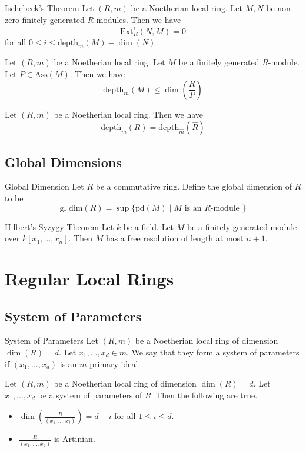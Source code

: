 \documentclass[a4paper]{article}
\begin{document}
\begin{thm}{Ischebeck's Theorem}{} Let $(R,m)$ be a Noetherian local ring. Let $M,N$ be non-zero finitely generated $R$-modules. Then we have $$\text{Ext}_R^i(N,M)=0$$ for all $0\leq i\leq\text{depth}_m(M)-\dim(N)$. 
\end{thm}

\begin{prp}{}{} Let $(R,m)$ be a Noetherian local ring. Let $M$ be a finitely generated $R$-module. Let $P\in\text{Ass}(M)$. Then we have $$\text{depth}_m(M)\leq\dim\left(\frac{R}{P}\right)$$
\end{prp}

\begin{prp}{}{} Let $(R,m)$ be a Noetherian local ring. Then we have $$\text{depth}_m(R)=\text{depth}_{\widehat{m}}(\widehat{R})$$
\end{prp}

\subsection{Global Dimensions}
\begin{defn}{Global Dimension}{} Let $R$ be a commutative ring. Define the global dimension of $R$ to be $$\text{gl dim}(R)=\sup\{\text{pd}(M)\;|\;M\text{ is an }R\text{-module }\}$$
\end{defn}

\begin{thm}{Hilbert's Syzygy Theorem}{} Let $k$ be a field. Let $M$ be a finitely generated module over $k[x_1,\dots,x_n]$. Then $M$ has a free resolution of length at most $n+1$. 
\end{thm}

\pagebreak
\section{Regular Local Rings}
\subsection{System of Parameters}
\begin{defn}{System of Parameters}{} Let $(R,m)$ be a Noetherian local ring of dimension $\dim(R)=d$. Let $x_1,\dots,x_d\in m$. We say that they form a system of parameters if $(x_1,\dots,x_d)$ is an $m$-primary ideal. 
\end{defn}

\begin{prp}{}{} Let $(R,m)$ be a Noetherian local ring of dimension $\dim(R)=d$. Let $x_1,\dots,x_d$ be a system of parameters of $R$. Then the following are true. 
\begin{itemize}
\item $\dim\left(\frac{R}{(x_1,\dots,x_i)}\right)=d-i$ for all $1\leq i\leq d$. 
\item $\frac{R}{(x_1,\dots,x_d)}$ is Artinian. 
\end{itemize}
\end{prp}
\end{document}
